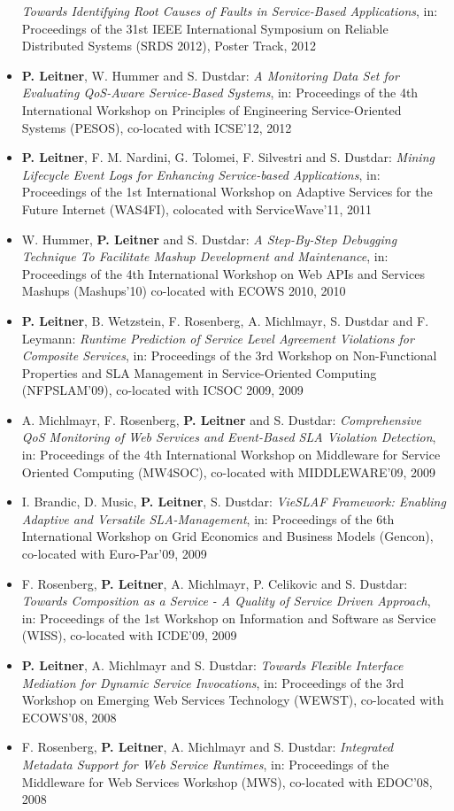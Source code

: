 \documentclass[paper=letter,fontsize=11pt]{scrartcl} %
\begin{document}
\begin{itemize}
\emph{Towards Identifying Root Causes of Faults in Service-Based Applications}, in: Proceedings of the 31st IEEE International Symposium on Reliable Distributed Systems (SRDS 2012), Poster Track, 2012
\item \textbf{P. Leitner}, W. Hummer and S. Dustdar:
\emph{A Monitoring Data Set for Evaluating QoS-Aware Service-Based Systems}, in: Proceedings of the 4th International Workshop on Principles of Engineering Service-Oriented Systems (PESOS), co-located with ICSE'12, 2012
\item \textbf{P. Leitner}, F. M. Nardini, G. Tolomei, F. Silvestri
and S. Dustdar: \emph{Mining Lifecycle Event Logs for Enhancing
Service-based Applications}, in: Proceedings of the 1st International Workshop on Adaptive Services
for the Future Internet (WAS4FI), colocated with ServiceWave'11, 2011
\item W. Hummer, \textbf{P. Leitner} and S. Dustdar: \emph{A Step-By-Step Debugging Technique To Facilitate Mashup Development and Maintenance}, in: Proceedings of the 4th International Workshop on Web APIs and Services Mashups (Mashups'10) co-located with ECOWS 2010, 2010
\item \textbf{P. Leitner}, B. Wetzstein, F. Rosenberg, A. Michlmayr, S. Dustdar and F. Leymann: \emph{Runtime Prediction of Service Level Agreement Violations for Composite Services}, in: Proceedings of the 3rd Workshop on Non-Functional Properties and SLA Management in Service-Oriented Computing (NFPSLAM'09), co-located with ICSOC 2009, 2009
\item A. Michlmayr, F. Rosenberg, \textbf{P. Leitner} and S. Dustdar: \emph{Comprehensive QoS Monitoring of Web Services and Event-Based SLA Violation Detection}, in: Proceedings of the 4th International Workshop on Middleware for Service Oriented Computing (MW4SOC), co-located with MIDDLEWARE'09, 2009
\item I. Brandic, D. Music, \textbf{P. Leitner}, S. Dustdar: \emph{VieSLAF Framework: Enabling Adaptive and Versatile SLA-Management}, in: Proceedings of the 6th International Workshop on Grid Economics and Business Models (Gencon), co-located with Euro-Par'09, 2009
\item F. Rosenberg, \textbf{P. Leitner}, A. Michlmayr, P. Celikovic and S. Dustdar: \emph{Towards Composition as a Service - A Quality of Service Driven Approach}, in: Proceedings of the 1st Workshop on Information and Software as Service (WISS), co-located with ICDE'09, 2009
\item \textbf{P. Leitner}, A. Michlmayr and S. Dustdar: \emph{Towards Flexible Interface Mediation for Dynamic Service Invocations}, in: Proceedings of the 3rd Workshop on Emerging Web Services Technology (WEWST), co-located with ECOWS'08, 2008
\item F. Rosenberg, \textbf{P. Leitner}, A. Michlmayr and S. Dustdar: \emph{Integrated Metadata Support for Web Service Runtimes}, in: Proceedings of the Middleware for Web Services Workshop (MWS), co-located with EDOC'08, 2008
\end{itemize}
\end{document}
